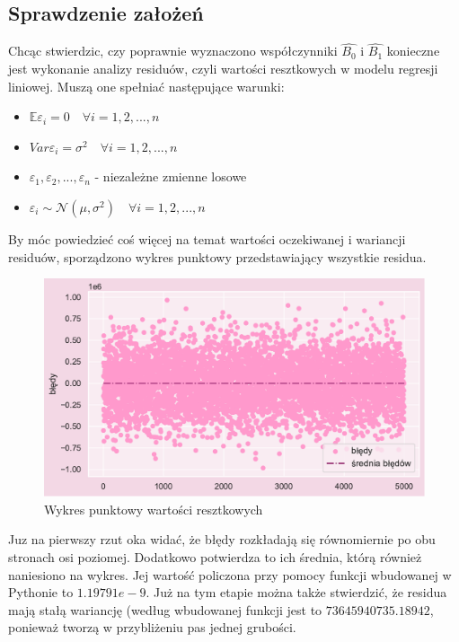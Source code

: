 \documentclass{article}
\begin{document}
\subsection{Sprawdzenie założeń}
Chcąc stwierdzic, czy poprawnie wyznaczono współczynniki $\hat{B_0}$ i $\hat{B_1}$ konieczne jest wykonanie analizy residuów, czyli wartości resztkowych w modelu regresji liniowej. Muszą one spełniać następujące warunki:
\begin{itemize}
    \item ${\mathbb{E}} \varepsilon_i = 0 \quad \forall i = 1,2,...,n$
    \item $Var \varepsilon_i = \sigma^2 \quad \forall i = 1,2,...,n$
    \item $\varepsilon_1, \varepsilon_2,...,\varepsilon_n$ - niezależne zmienne losowe
    \item $\varepsilon_i \sim \mathcal{N} (\mu,\sigma^2) \quad \forall i = 1,2,...,n $
\end{itemize} 
By móc powiedzieć coś więcej na temat wartości oczekiwanej i wariancji residuów, sporządzono wykres punktowy przedstawiający wszystkie residua.
\begin{figure}[H]
	\begin{center}
		\includegraphics[scale=0.68]{images/resi_scatter.pdf}
		\caption{Wykres punktowy wartości resztkowych}
		\label{denistyx}
	\end{center}
    \end{figure}
\noindent Juz na pierwszy rzut oka widać, że błędy rozkładają się równomiernie po obu stronach osi poziomej. Dodatkowo potwierdza to ich średnia, którą również naniesiono na wykres. Jej wartość policzona przy pomocy funkcji wbudowanej w Pythonie to $1.19791e-9$. Już na tym etapie można także stwierdzić, że residua mają stałą wariancję (według wbudowanej funkcji jest to $73645940735.18942$, ponieważ tworzą w przybliżeniu pas jednej grubości. \\\\
\end{document}

